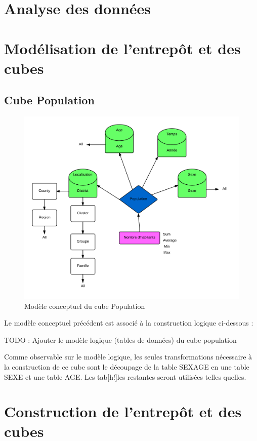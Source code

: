 \chapter{Analyse des données}

\pagebreak


\chapter{Modélisation de l'entrepôt et des cubes}
\section{Cube Population}
\begin{figure}[h!]
    \centering
    \includegraphics[width=\linewidth]{images/pop/cube.png}
    \caption{Modèle conceptuel du cube Population}
    \label{conception_cube_pop}
\end{figure}

Le modèle conceptuel précédent est associé à la construction logique ci-dessous :

TODO : Ajouter le modèle logique (tables de données) du cube population

Comme observable sur le modèle logique, les seules transformations nécessaire à la construction de ce cube sont le découpage de la table SEXAGE en une table SEXE et une table AGE. Les tab[h!]les restantes seront utilisées telles quelles.
\pagebreak


\chapter{Construction de l'entrepôt et des cubes}

